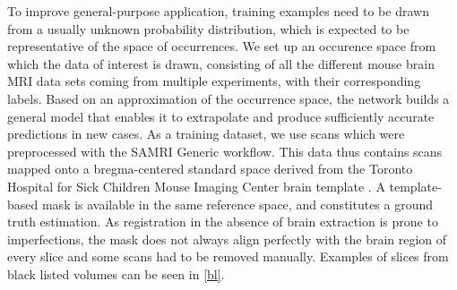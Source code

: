To improve general-purpose application, training examples need to be drawn from a usually unknown probability distribution, which is expected to be representative of the space of occurrences.
We set up an occurence space from which the data of interest is drawn, consisting of all the different mouse brain MRI data sets coming from multiple experiments, with their corresponding labels.
Based on an approximation of the occurrence space, the network builds a general model that enables it to extrapolate and produce sufficiently accurate predictions in new cases.
As a training dataset, we use scans which were preprocessed with the SAMRI \cite{noauthor_ibt-fmi/samri_2019} Generic workflow.
This data thus contains scans mapped onto a bregma-centered standard \cite{ioanas_optimized_2019} space derived from the Toronto Hospital for Sick Children Mouse Imaging Center brain template \cite{dsu}.
A template-based mask is available in the same reference space, and constitutes a ground truth estimation.
As registration in the absence of brain extraction is prone to imperfections, the mask does not always align perfectly with the brain region of every slice and some scans had to be removed manually.
Examples of slices from black listed volumes can be seen in \cref{bl}.
